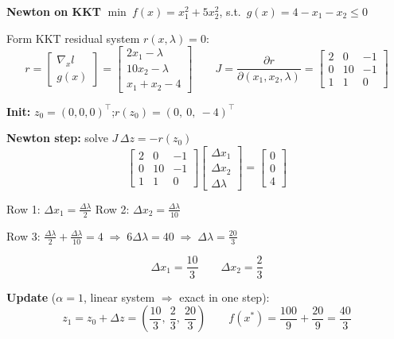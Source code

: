\documentclass[10pt,a3paper]{article}
\begin{document}
\noindent
\begin{minipage}[t]{0.45\linewidth}

\noindent\textbf{Newton on KKT} \quad $\min\ f(x) = x_1^2+5x_2^2$,\; s.t.\ $g(x)=4-x_1-x_2 \leq 0$

\noindent Form KKT residual system $r(x,\lambda)=0$:
\[
  r = \begin{bmatrix} \nabla_x l \\ g(x) \end{bmatrix}
    = \begin{bmatrix} 2x_1-\lambda \\ 10x_2-\lambda \\ x_1+x_2-4 \end{bmatrix}
  \qquad
  J = \frac{\partial r}{\partial(x_1,x_2,\lambda)}
    = \begin{bmatrix} 2&0&-1\\0&10&-1\\1&1&0 \end{bmatrix}
\]

\noindent\textbf{Init:} $z_0=(0,0,0)^\top$;\quad $r(z_0)=(0,\ 0,\ -4)^\top$

\noindent\textbf{Newton step:} solve $J\,\Delta z = -r(z_0)$
\[
  \begin{bmatrix}2&0&-1\\0&10&-1\\1&1&0\end{bmatrix}
  \begin{bmatrix}\Delta x_1\\\Delta x_2\\\Delta\lambda\end{bmatrix}
  =\begin{bmatrix}0\\0\\4\end{bmatrix}
\]

Row 1: $\Delta x_1 = \tfrac{\Delta\lambda}{2}$\quad
Row 2: $\Delta x_2 = \tfrac{\Delta\lambda}{10}$

Row 3: $\tfrac{\Delta\lambda}{2}+\tfrac{\Delta\lambda}{10}=4 \;\Rightarrow\; 6\Delta\lambda=40 \;\Rightarrow\; \Delta\lambda=\tfrac{20}{3}$

\[
  \Delta x_1 = \frac{10}{3} \qquad \Delta x_2 = \frac{2}{3}
\]

\noindent\textbf{Update} ($\alpha=1$, linear system $\Rightarrow$ exact in one step):
\[
  z_1 = z_0+\Delta z = \left(\frac{10}{3},\ \frac{2}{3},\ \frac{20}{3}\right)
  \qquad f(x^*) = \frac{100}{9}+\frac{20}{9} = \frac{40}{3}
\]

\end{minipage}\hfill
\end{document}
